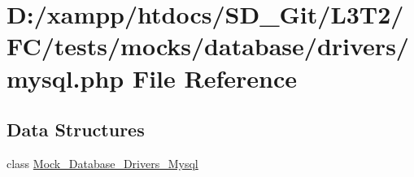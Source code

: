 \hypertarget{tests_2mocks_2database_2drivers_2mysql_8php}{}\section{D\+:/xampp/htdocs/\+S\+D\+\_\+\+Git/\+L3\+T2/\+F\+C/tests/mocks/database/drivers/mysql.php File Reference}
\label{tests_2mocks_2database_2drivers_2mysql_8php}
\subsection*{Data Structures}
\begin{DoxyCompactItemize}
\item 
class \hyperlink{class_mock___database___drivers___mysql}{Mock\+\_\+\+Database\+\_\+\+Drivers\+\_\+\+Mysql}
\end{DoxyCompactItemize}

